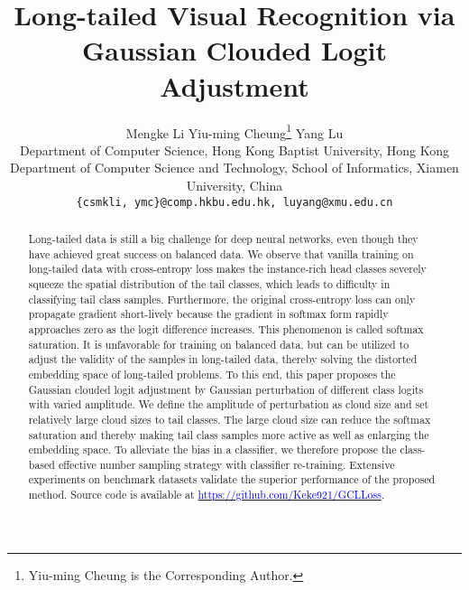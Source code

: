 \documentclass[10pt,twocolumn,letterpaper]{article}
\begin{document}
\title{Long-tailed Visual Recognition via Gaussian Clouded Logit Adjustment}
\author{
	Mengke Li \quad Yiu-ming Cheung\thanks{Yiu-ming Cheung is the Corresponding Author.} \quad Yang Lu \vspace{.3em}\\
	Department of Computer Science, Hong Kong Baptist University, Hong Kong\\
	Department of Computer Science and Technology, School of Informatics, Xiamen University, China\\
	{\tt\small \{csmkli, ymc\}@comp.hkbu.edu.hk, luyang@xmu.edu.cn}
}

\maketitle

\begin{abstract}
Long-tailed data is still a big challenge for deep neural networks, even though they have achieved great success on balanced data. We observe that vanilla training on long-tailed data with cross-entropy loss makes the instance-rich head classes severely squeeze the spatial distribution of the tail classes, which leads to difficulty in classifying tail class samples. Furthermore, the original cross-entropy loss can only propagate gradient short-lively because the gradient in softmax form rapidly approaches zero as the logit difference increases. This phenomenon is called softmax saturation. It is unfavorable for training on balanced data, but can be utilized to adjust the validity of the samples in long-tailed data, thereby solving the distorted embedding space of long-tailed problems. To this end, this paper proposes the Gaussian clouded logit adjustment by Gaussian perturbation of different class logits with varied amplitude. We define the amplitude of perturbation as cloud size and set relatively large cloud sizes to tail classes. The large cloud size can reduce the softmax saturation and thereby making tail class samples more active as well as enlarging the embedding space. To alleviate the bias in a classifier, we therefore propose the class-based effective number sampling strategy with classifier re-training. Extensive experiments on benchmark datasets validate the superior performance of the proposed method. Source code is available at \href{https://github.com/Keke921/GCLLoss}{\textcolor{blue}{https://github.com/Keke921/GCLLoss}}.
\end{abstract}
\end{document}
